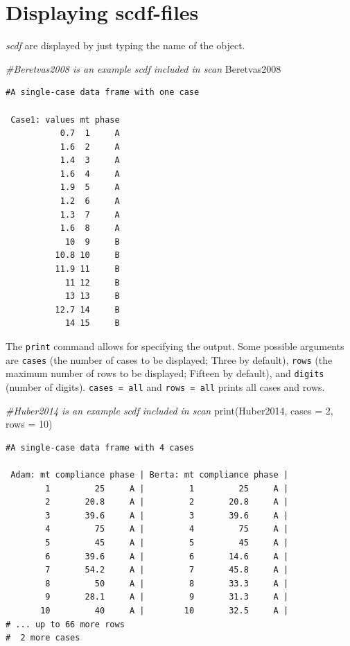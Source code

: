 \documentclass[
]{book}
\newenvironment{Shaded}{\begin{snugshade}}{\end{snugshade}}
\newcommand{\AttributeTok}[1]{\textcolor[rgb]{0.77,0.63,0.00}{#1}}
\newcommand{\CommentTok}[1]{\textcolor[rgb]{0.56,0.35,0.01}{\textit{#1}}}
\newcommand{\DecValTok}[1]{\textcolor[rgb]{0.00,0.00,0.81}{#1}}
\newcommand{\FunctionTok}[1]{\textcolor[rgb]{0.00,0.00,0.00}{#1}}
\newcommand{\NormalTok}[1]{#1}
\begin{document}
\hypertarget{displaying-scdf-files}{%
\section{Displaying scdf-files}\label{displaying-scdf-files}}

\emph{scdf} are displayed by just typing the name of the object.

\begin{Shaded}
\begin{Highlighting}[]
\CommentTok{\#Beretvas2008 is an example scdf included in scan}
\NormalTok{Beretvas2008}
\end{Highlighting}
\end{Shaded}

\begin{verbatim}
#A single-case data frame with one case

 Case1: values mt phase
           0.7  1     A
           1.6  2     A
           1.4  3     A
           1.6  4     A
           1.9  5     A
           1.2  6     A
           1.3  7     A
           1.6  8     A
            10  9     B
          10.8 10     B
          11.9 11     B
            11 12     B
            13 13     B
          12.7 14     B
            14 15     B
\end{verbatim}

The \texttt{print} command allows for specifying the output. Some possible arguments are \texttt{cases} (the number of cases to be displayed; Three by default), \texttt{rows} (the maximum number of rows to be displayed; Fifteen by default), and \texttt{digits} (number of digits). \texttt{cases\ =\ \textquotesingle{}all\textquotesingle{}} and \texttt{rows\ =\ \textquotesingle{}all\textquotesingle{}} prints all cases and rows.

\begin{Shaded}
\begin{Highlighting}[]
\CommentTok{\#Huber2014 is an example scdf included in scan}
\FunctionTok{print}\NormalTok{(Huber2014, }\AttributeTok{cases =} \DecValTok{2}\NormalTok{, }\AttributeTok{rows =} \DecValTok{10}\NormalTok{)}
\end{Highlighting}
\end{Shaded}

\begin{verbatim}
#A single-case data frame with 4 cases

 Adam: mt compliance phase | Berta: mt compliance phase |
        1         25     A |         1         25     A |
        2       20.8     A |         2       20.8     A |
        3       39.6     A |         3       39.6     A |
        4         75     A |         4         75     A |
        5         45     A |         5         45     A |
        6       39.6     A |         6       14.6     A |
        7       54.2     A |         7       45.8     A |
        8         50     A |         8       33.3     A |
        9       28.1     A |         9       31.3     A |
       10         40     A |        10       32.5     A |
# ... up to 66 more rows
#  2 more cases
\end{verbatim}
\end{document}
